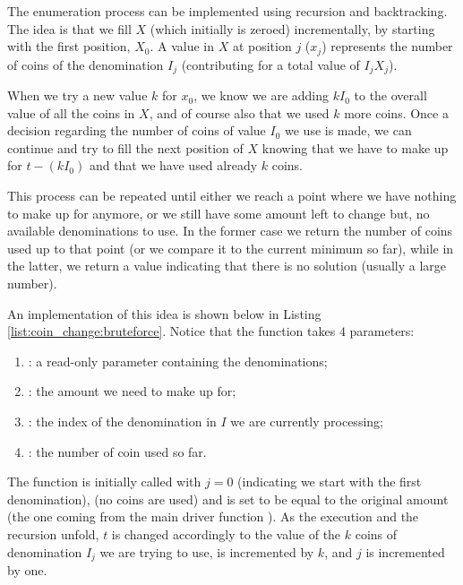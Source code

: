The enumeration process can be implemented using recursion and backtracking. 
The idea is that we fill $X$ (which initially is zeroed) incrementally, by starting with the first position, $X_0$.
A value in $X$ at position $j$ ($x_j$) represents the number of coins of the denomination $I_j$ (contributing for a total value of $I_j X_j$). 

When we try a new value $k$ for $x_0$, we know we are adding $kI_0$ to the overall value of all the coins in $X$, and of course also that we used $k$ more coins.
Once a decision regarding the number of coins of value $I_0$ we use is made, we can continue and try to fill the next position of $X$ knowing that we have to make up for $t-(kI_0)$ and that we have used already $k$ coins. 

This process can be repeated until either we reach a point where we have nothing to make up for anymore, or we still have some amount left to change but, no available denominations to use.
In the former case we return the number of coins used up to that point (or we compare it to the current minimum so far), while in the latter, we return a value indicating that there is no solution (usually a large number).

An implementation of this idea is shown below in Listing \ref{list:coin_change:bruteforce}.
Notice that the function  takes $4$ parameters:
\begin{enumerate}
	\item {}: a read-only parameter containing the denominations;
	\item {}: the amount we need to make up for;
	\item {}: the index of the denomination in $I$ we are currently processing;
	\item {}: the number of coin used so far.
\end{enumerate}




The function is initially called with $j=0$ (indicating we start with the first denomination),  (no coins are used) and  is set to be equal to the original amount (the one coming from the main driver function ).
As the execution and the recursion unfold, $t$ is changed accordingly to the value of the $k$ coins of denomination $I_j$ we are trying to use,  is incremented by $k$, and $j$ is incremented by one.

